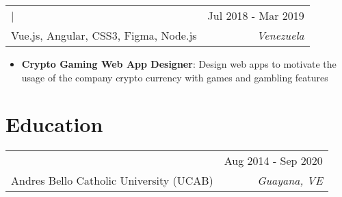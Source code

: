 \documentclass[letterpaper,10.8pt]{article}
\makeatletter
\newcommand{\normalFont}[1]{\fontsize{9.5pt}{11pt}{\selectfont{#1}}}
\newcommand{\largeFont}[1]{\fontsize{11pt}{11pt}{\selectfont{#1}}}
\newcommand{\resumeItem}[2]{
  \item{
      \small\textbf{#1}{: #2 \vspace{-4pt}}
    }
  }
\newcommand{\resumeSubheading}[5]{
    \begin{tabular*}{1\textwidth}{l@{\extracolsep{\fill}}r}
      \largeFont{\textbf{#1}} | \normalFont{#3} & \small{#4} \\
      {\normalFont{Stack: } #5} & \textit{\small #2} \\
    \end{tabular*}\vspace{-8pt}
  }
\newcommand{\educationSubheading}[4]{
    \begin{tabular*}{1\textwidth}{l@{\extracolsep{\fill}}r}
      \largeFont{\textbf{#1}} & \small{#4} \\
      {\small #3} & \textit{\small #2} \\
    \end{tabular*}\vspace{-5pt}
  }
\newcommand{\resumeItemListStart}{\begin{itemize}}
\newcommand{\resumeItemListEnd}{\end{itemize}\vspace{4pt}}
\makeatother
\begin{document}
\resumeSubheading
{Lead Web Developer}{ Venezuela }
{Pintosoft}{ Jul 2018 - Mar 2019 }
{Vue.js, Angular, CSS3, Figma, Node.js}

\resumeItemListStart
\resumeItem{Crypto Gaming Web App Designer}
{Design web apps to motivate the usage of the company crypto currency with games and gambling features }
\resumeItemListEnd

\vspace{-8pt}
\section{Education}
\educationSubheading
{Bachelor of Computer Science}{Guayana, VE}
{Andres Bello Catholic University (UCAB)}{Aug 2014 - Sep 2020}
\end{document}
